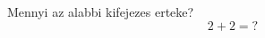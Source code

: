 \documentclass[exercise]{math-standalone}
\begin{document}
\begin{exercise}{Mennyi az alabbi kifejezes erteke?}
  \[
    2 + 2 = ?
  \]

  \exsol{
    \[
      2 + 2 = 4
    \]
  }
\end{exercise}
\end{document}
